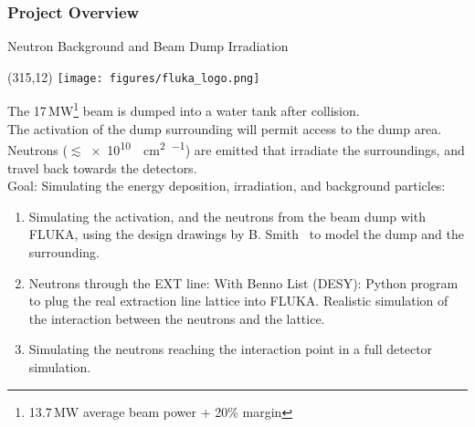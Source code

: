 \documentclass[xcolor={dvipsnames}]{beamer}
\newcommand{\flukalogo}{
  \setlength{\TPHorizModule}{1pt}
  \setlength{\TPVertModule}{1pt}
  \begin{textblock}{1}(315,12)
   \texttt{[image: figures/fluka\_logo.png]}
  \end{textblock}
}
\begin{document}
\subsubsection{Project Overview}
{
\begin{frame}{Neutron Background and Beam Dump Irradiation}
\flukalogo
The 17\,MW\footnote{13.7\,MW average beam power + 20\% margin} beam is dumped into a water tank after collision.\\The activation of the dump surrounding will permit access to the dump area. Neutrons ($\lesssim$\SI{e10}{\per\square\centi\metre\per\year}) are emitted that irradiate the surroundings, and travel back towards the detectors.~\cite{SLAC_FLUKA}\\
\vspace*{0.1cm}
\alert{Goal: Simulating the energy deposition, irradiation, and background particles:}
\begin{enumerate}
 \item Simulating the activation, and the neutrons from the beam dump with FLUKA, using the design drawings by B. Smith~\cite{Smith} to model the dump and the surrounding.
 \item Neutrons through the EXT line: With Benno List (DESY): Python program to plug the real extraction line lattice into FLUKA. Realistic simulation of the interaction between the neutrons and the lattice.
 \item Simulating the neutrons reaching the interaction point in a full detector simulation.
\end{enumerate}
\end{frame}
}
\end{document}
